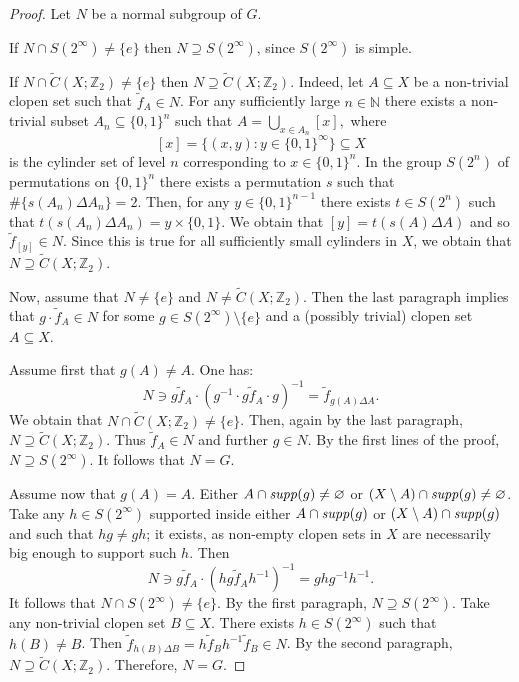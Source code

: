 \documentclass[11pt]{amsart}
\newcommand{\suppg}{{\it supp}}
\theoremstyle{plain}
\theoremstyle{definition}
\theoremstyle{remark}
\numberwithin{equation}{section}
\begin{document}
\begin{proof}
		Let $N$ be a normal subgroup of $G$.

If $N\cap S(2^\infty)\neq \{e\}$ then $N\supseteq S(2^\infty)$, since $S(2^\infty)$ is simple.

If $N\cap \widetilde C(X;\mathbb{Z}_2)\neq\{e\}$ then $N\supseteq \widetilde C(X;\mathbb{Z}_2)$. Indeed, let $A\subseteq X$ be a non-trivial clopen set such that $\widetilde f_A\in N$. For any sufficiently large $n\in\mathbb N$ there exists a non-trivial subset $A_n\subseteq\{0,1\}^n$ such that $A=\bigcup\limits_{x\in A_n}[x],$ where 
\begin{equation}\label{equation: cylinder sets}[x]=\{(x,y):y\in \{0,1\}^\infty\}\subseteq X\end{equation} 
is the cylinder set of level $n$ corresponding to $x\in\{0,1\}^n$. In the group $S(2^n)$ of permutations on $\{0,1\}^n$ there exists a permutation $s$ such that $\#\{s(A_n)\Delta A_n\}=2$. Then, for any $y\in\{0,1\}^{n-1}$ there exists $t\in S(2^n)$ such that $t(s(A_n)\Delta A_n)=y\times \{0,1\}$. We obtain that $[y]=t(s(A)\Delta A)$ and so $\widetilde f_{[y]}\in N$. Since this is true for all sufficiently small cylinders in $X$, we obtain that $N\supseteq \widetilde C(X;\mathbb{Z}_2)$.
	
Now, assume  that $N\neq\{e\}$ and $N\neq\widetilde C(X;\mathbb{Z}_2)$. Then the last paragraph implies that $g\cdot\widetilde f_A\in N$ for some $g\in S(2^\infty)\setminus \{e\}$ and a (possibly trivial) clopen set $A\subseteq X$.  %

	\vskip 0.1cm Assume first that  $g(A)\neq A$. One has:
$$ N\ni g\widetilde f_A\cdot (g^{-1}\cdot g\widetilde f_A\cdot g)^{-1}=\widetilde f_{g(A)\Delta A}.$$ 
We obtain that $N\cap \widetilde C(X;\mathbb Z_2)\neq\{e\}$. Then, again by the last paragraph, $N\supseteq \widetilde C(X;\mathbb{Z}_2)$. Thus $\widetilde f_A\in N$ and further  $g\in N$. By the first lines of the proof, $N\supseteq S(2^\infty)$. It follows that $N=G$.

\vskip 0.1cm   Assume now that $g(A)=A$. Either $A\cap \suppg(g)\neq\varnothing$ or $(X\setminus A)\cap \suppg(g)\neq\varnothing$. %
Take any $h\in S(2^\infty)$ supported inside either $A\cap \suppg(g)$ or $(X\setminus A)\cap \suppg(g)$ and such that $hg\neq gh$; it exists, as non-empty clopen sets in $X$ are necessarily big enough to support such $h$.
	Then 
	$$N\ni g\widetilde f_A\cdot (hg\widetilde f_A h^{-1})^{-1}=ghg^{-1}h^{-1}.$$ It follows that $N\cap S(2^\infty)\neq\{e\}$. By the first paragraph, $N\supseteq S(2^\infty)$. Take any non-trivial clopen set $B\subseteq X$. There exists $h\in S(2^\infty)$ such that $h(B)\neq B$. Then $\widetilde f_{h(B)\Delta B}=h\widetilde f_Bh^{-1}\widetilde f_B\in N$. By the second paragraph, $N\supseteq \widetilde C(X;\mathbb{Z}_2)$. Therefore, $N=G$.
	
\end{proof}
\end{document}
